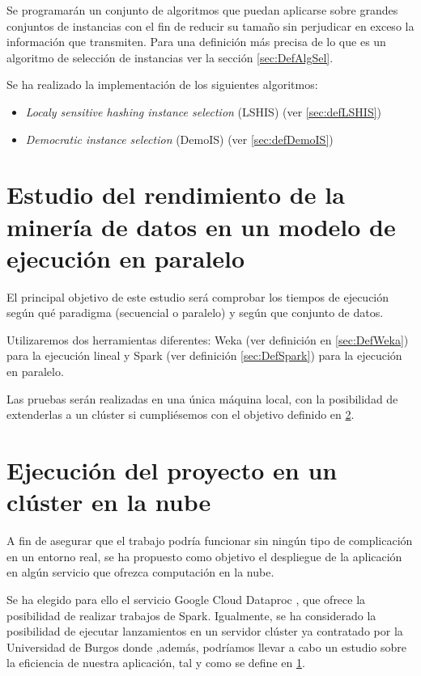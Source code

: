 Se programarán un conjunto de algoritmos que puedan aplicarse sobre grandes conjuntos de instancias con el fin de reducir su tamaño sin perjudicar en exceso la información que transmiten. Para una definición más precisa de lo que es un algoritmo de selección de instancias ver la sección \ref{sec:DefAlgSel}.

Se ha realizado la implementación de los siguientes algoritmos:

\begin{itemize}
	\item \textit{Localy sensitive hashing instance selection} (LSHIS) (ver \ref{sec:defLSHIS}) \cite{LSHISPaper}
	\item \textit{Democratic instance selection} (DemoIS) (ver \ref{sec:defDemoIS}) \cite{DemoISPaper}
\end{itemize}


\section{Estudio del rendimiento de la minería de datos en un modelo de ejecución en paralelo}\label{sec:estudio}

El principal objetivo de este estudio será comprobar los tiempos de ejecución según qué paradigma (secuencial o paralelo) y según que conjunto de datos.

Utilizaremos dos herramientas diferentes: Weka (ver definición en \ref{sec:DefWeka}) para la ejecución lineal y Spark (ver definición \ref{sec:DefSpark}) para la ejecución en paralelo.

Las pruebas serán realizadas en una única máquina local, con la posibilidad de extenderlas a un clúster si cumpliésemos con el objetivo definido en \ref{sec:ejecucionNube}.

\section{Ejecución del proyecto en un clúster en la nube}\label{sec:ejecucionNube}

A fin de asegurar que el trabajo podría funcionar sin ningún tipo de complicación en un entorno real, se ha propuesto como objetivo el despliegue de la aplicación en algún servicio que ofrezca computación en la nube.

Se ha elegido para ello el servicio Google Cloud Dataproc \cite{dataprocSoft}, que ofrece la posibilidad de realizar trabajos de Spark. Igualmente, se ha considerado la posibilidad de ejecutar lanzamientos en un servidor clúster ya contratado por la Universidad de Burgos donde ,además, podríamos llevar a cabo un estudio sobre la eficiencia de nuestra aplicación, tal y como se define en \ref{sec:estudio}.


